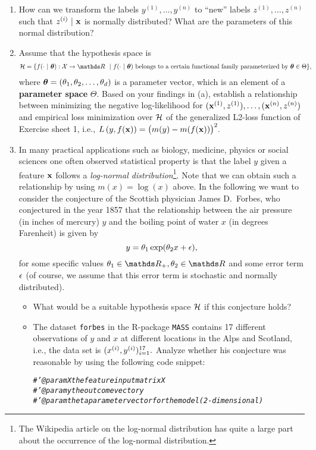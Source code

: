 \documentclass[a4paper]{article}
\makeatletter
\newcommand{\hlcom}[1]{\textcolor[rgb]{0.678,0.584,0.686}{\textit{#1}}}%
\newenvironment{kframe}{%
 \def\at@end@of@kframe{}%
 \ifinner\ifhmode%
  \def\at@end@of@kframe{\end{minipage}}%
  \begin{minipage}{\columnwidth}%
 \fi\fi%
 \def\FrameCommand##1{\hskip\@totalleftmargin \hskip-\fboxsep
 \colorbox{shadecolor}{##1}\hskip-\fboxsep
     \hskip-\linewidth \hskip-\@totalleftmargin \hskip\columnwidth}%
 \MakeFramed {\advance\hsize-\width
   \@totalleftmargin\z@ \linewidth\hsize
   \@setminipage}}%
 {\par\unskip\endMakeFramed%
 \at@end@of@kframe}
\newenvironment{knitrout}{}{} %
\makeatother
\begin{document}
{\begin{enumerate}
%	
	\item  How can we transform the labels $y^{(1)},\ldots,y^{(n)}$ to ``new'' labels $z^{(1)},\ldots,z^{(n)}$ such that $z^{(i)}~|~\mathbf{x}$ is normally distributed? What are the parameters of this normal distribution?
%  
	\item Assume that the hypothesis space is 
	\begin{equation*}
    \begin{split}
      \Hspace = \{f(\cdot~|~ \thetab): \Xspace \to \R \ ~|~   & f(\cdot~|~ \thetab) \text{ belongs to a certain
       functional family parameterized by } \thetab \in \Theta \},
    \end{split}
  \end{equation*}
  where $\bm{\theta} = (\theta_1, \theta_2, \ldots, \theta_d)$ is a parameter vector, which is an element of a \textbf{parameter space} 
  $\Theta$.
	Based on your findings in (a), establish a relationship between minimizing the negative log-likelihood for  $(\mathbf{x}^{(1)},z^{(1)}),\ldots,(\mathbf{x}^{(n)},z^{(n)})$ and empirical loss minimization over $\mathcal{H}$ of the generalized L2-loss function of Exercise sheet 1, i.e., $L\left(y, f(\mathbf{x})\right)= \big(m(y)-m(f(\mathbf{x}))\big)^2.$ 
%   
	\item In many practical applications such as biology, medicine, physics or social sciences one often observed statistical property is that the label $y$ given a feature $\mathbf{x}$ follows a \emph{log-normal distribution}\footnote{The Wikipedia article on the log-normal distribution has quite a large part about the occurrence of the log-normal distribution.}.
%	
	Note that we can obtain such a relationship by using $m(x)=\log(x)$ above.
%  
	In the following we want to consider the conjecture of the Scottish physician James D.\ Forbes, who conjectured in the year 1857 that the relationship between the air pressure (in inches of mercury) $y$ and the boiling point of water $x$ (in degrees Farenheit) is given by
%	
	$$  y = \theta_1 \exp(\theta_2 x + \epsilon),$$
%	
	for some specific values $\theta_1 \in \R_+,\theta_2\in \R$ and some error term $\epsilon$ (of course, we assume that this error term is stochastic and normally distributed).
%	
	\begin{itemize}
%		
		\item What would be a suitable hypothesis space $\mathcal{H}$ if this conjecture holds?
%		
		\item The dataset \texttt{forbes} in the R-package \texttt{MASS} contains 17 different observations of $y$ and $x$ at different locations in the Alps and Scotland, i.e., the data set is $(x^{(i)},y^{(i)})_{i=1}^{17}.$
%		
  Analyze whether his conjecture was reasonable by using the following code snippet:
\begin{knitrout}
\color{fgcolor}\begin{kframe}
\begin{alltt}
\hlcom{#' @param X the feature input matrix X}
\hlcom{#' @param y the outcome vector y}
\hlcom{#' @param theta parameter vector for the model (2-dimensional)}


\end{alltt}
\end{kframe}
\end{knitrout}
\end{itemize}
\end{enumerate}}
\end{document}
